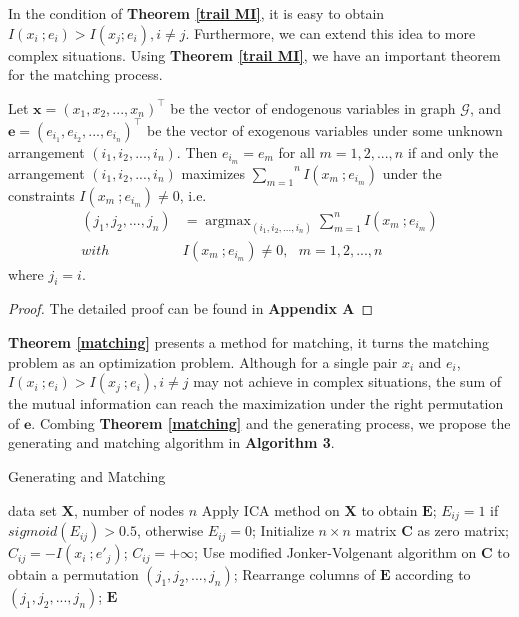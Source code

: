 \documentclass[twoside,11pt]{article}
\begin{document}
In the condition of \textbf{Theorem \ref{trail MI}}, it is easy to obtain $I(x_i\ ; e_i)>I(x_j; e_i), i\neq j$. Furthermore, we can extend this idea to more complex situations. Using \textbf{Theorem \ref{trail MI}}, we have an important theorem for the matching process.
\begin{theorem}
\label{matching}
Let $\mathbf x=(x_1, x_2, ..., x_n)^\top$ be the vector of endogenous variables in graph $\mathcal G$, and $\mathbf e=(e_{i_1}, e_{i_2}, ..., e_{i_n})^\top$ be the vector of exogenous variables under some unknown arrangement $(i_1, i_2, ..., i_n)$. Then $e_{i_m}=e_m$ for all $m=1, 2, ..., n$ if and only the arrangement $(i_1, i_2, ..., i_n)$ maximizes $\overset{n}{\underset{m=1}{\sum}} I(x_m\ ; e_{i_m})$ under the constraints $I(x_m\ ;e_{i_m})\neq 0$, i.e.
\begin{align}
\label{maximize MI}
(j_1, j_2, ..., j_n)&=\mathop{\arg\max}_{(i_1, i_2, ..., i_n)}\sum^n_{m=1} I(x_m\ ; e_{i_m})
\\ with\ \ \ \ \ \ \ &I(x_m\ ;e_{i_m})\neq 0, \ \ \ m=1, 2, ..., n \label{constraints}
\end{align}
where $j_i=i$.
\end{theorem}
\begin{proof}
    The detailed proof can be found in \textbf{Appendix A}
\end{proof}

\textbf{Theorem \ref{matching}} presents a method for matching, it turns the matching problem as an optimization problem. Although for a single pair $x_i$ and $e_i$, $I(x_i\ ; e_i)>I(x_j\ ; e_i), i\neq j$ may not achieve in complex situations, the sum of the mutual information can reach the maximization under the right permutation of $\mathbf e$. Combing \textbf{Theorem \ref{matching}} and the generating process, we propose the generating and matching algorithm in \textbf{Algorithm 3}.

\begin{algorithm}
\renewcommand{\algorithmicrequire}{\textbf{Input:}}
\renewcommand{\algorithmicensure}{\textbf{Output:}}
\caption{Generating and Matching}
\label{GM}
\begin{algorithmic}[1]
\REQUIRE data set $\mathbf X$, number of nodes $n$
\STATE Apply ICA method on $\mathbf X$ to obtain $\mathbf E$;
\STATE $E_{ij}=1$ if $sigmoid(E_{ij})>0.5$, otherwise $E_{ij}=0$;
\ENDFOR
\ENDIF
\STATE Initialize $n\times n$ matrix $\mathbf C$ as zero matrix;
\STATE $C_{ij}=-I(x_i\ ; e'_j)$;
\STATE $C_{ij}=+\infty$;
\ENDIF
\ENDFOR
\ENDFOR
\STATE Use modified Jonker-Volgenant algorithm on $\mathbf C$ to obtain a permutation $(j_1, j_2, ..., j_n)$;
\STATE Rearrange columns of $\mathbf E$ according to $(j_1, j_2, ..., j_n)$;
\ENSURE $\mathbf E$
\end{algorithmic}
\end{algorithm}
\end{document}
